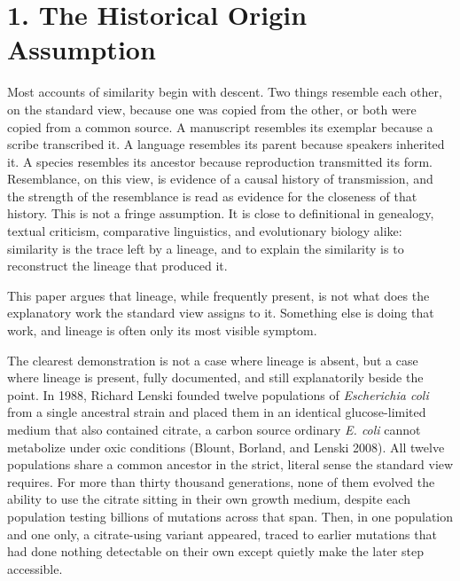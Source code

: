 \documentclass[11pt]{article}
\theoremstyle{plain}
\begin{document}
\newpage

\tableofcontents
\bigskip

\section*{1. The Historical Origin Assumption}

Most accounts of similarity begin with descent. Two things resemble each other, on the standard view, because one was copied from the other, or both were copied from a common source. A manuscript resembles its exemplar because a scribe transcribed it. A language resembles its parent because speakers inherited it. A species resembles its ancestor because reproduction transmitted its form. Resemblance, on this view, is evidence of a causal history of transmission, and the strength of the resemblance is read as evidence for the closeness of that history. This is not a fringe assumption. It is close to definitional in genealogy, textual criticism, comparative linguistics, and evolutionary biology alike: similarity is the trace left by a lineage, and to explain the similarity is to reconstruct the lineage that produced it.

This paper argues that lineage, while frequently present, is not what does the explanatory work the standard view assigns to it. Something else is doing that work, and lineage is often only its most visible symptom.

The clearest demonstration is not a case where lineage is absent, but a case where lineage is present, fully documented, and still explanatorily beside the point. In 1988, Richard Lenski founded twelve populations of \emph{Escherichia coli} from a single ancestral strain and placed them in an identical glucose-limited medium that also contained citrate, a carbon source ordinary \emph{E. coli} cannot metabolize under oxic conditions (Blount, Borland, and Lenski 2008). All twelve populations share a common ancestor in the strict, literal sense the standard view requires. For more than thirty thousand generations, none of them evolved the ability to use the citrate sitting in their own growth medium, despite each population testing billions of mutations across that span. Then, in one population and one only, a citrate-using variant appeared, traced to earlier mutations that had done nothing detectable on their own except quietly make the later step accessible.
\end{document}
